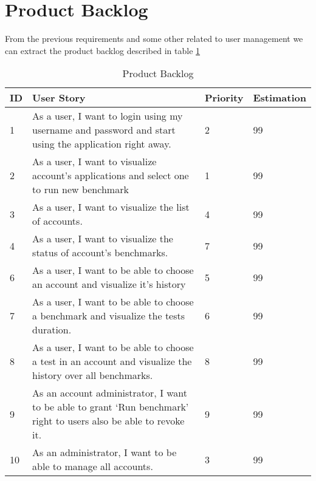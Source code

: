 \section{Product Backlog}
From the previous requirements and some other related to user management we can
extract the product backlog described in table \hyperref[product-backlog]{\ref{product-backlog}}

\begin{table}[!hp]
\caption{Product Backlog}
\label{product-backlog}
\centering
  \begin{tabular}{ | p{2cm}  | p{7cm}  | p{2cm} | p{2cm}| }
    \hline

    ID & User Story                                                                                                        & Priority        & Estimation\\ \hline

    1 & As a user, I want to login using my username and password and start using the application right away.              & 2              & 99        \\ \hline
    2 & As a user, I want to visualize account’s applications and select one to run new benchmark                          & 1              & 99        \\ \hline
    3 & As a user, I want to visualize the list of accounts.                                                               & 4              & 99        \\ \hline
    4 & As a user, I want to visualize the status of account’s benchmarks.                                                 & 7              & 99        \\ \hline
    6 & As a user, I want to be able to choose an account and visualize it’s history                                       & 5              & 99        \\ \hline
    7 & As a user, I want to be able to choose a benchmark and visualize the tests duration.                              & 6              & 99        \\ \hline
    8 & As a user, I want to be able to choose a test in an account and visualize the history over all benchmarks.         & 8              & 99        \\ \hline
    9 & As an account administrator, I want to be able to grant ‘Run benchmark’  right to users also be able to revoke it. & 9              & 99        \\ \hline
    10 & As an administrator, I want to be able to manage all accounts.                                                    & 3              & 99        \\ \hline

    \hline
  \end{tabular}
\end{table}

